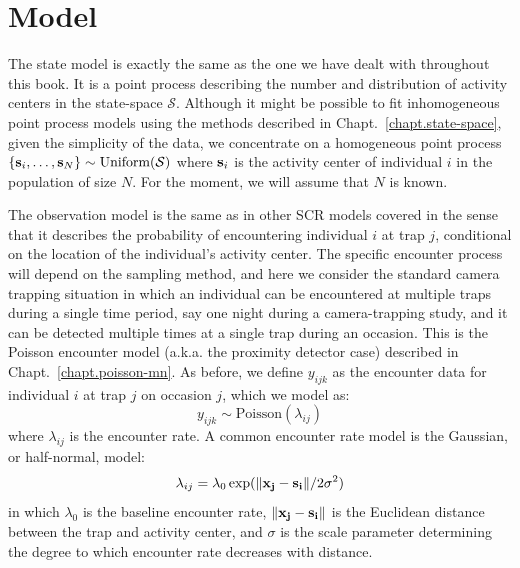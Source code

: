 
\section{Model}

The state model is exactly the same as the one we have dealt with
throughout
this book. It is a point process describing the number and distribution of
activity centers in the state-space $\mathcal{S}$. Although it might
be possible to fit inhomogeneous point process models using the
methods described in Chapt.~\ref{chapt.state-space},
given the simplicity of the data, we concentrate on a homogeneous point process
$\{{\bf s}_i, \ldots, {\bf s}_N\} \sim \text{Uniform}(\mathcal{S})$
where ${\bf s}_i$ is the activity center of individual $i$ in the
population of size $N$. For the moment, we will assume that $N$ is
known.

The observation model is the same as in other SCR models covered
in the sense that it describes the probability of encountering individual
$i$ at trap $j$, conditional on the location of the individual's
activity center. The specific encounter process will depend on the
sampling method, and here we consider the standard camera trapping
situation in which an individual can be encountered at multiple traps
during a single time period, say one night during a camera-trapping
study, and it can be detected multiple times at a single trap during
an occasion. This is the Poisson encounter model (a.k.a. the proximity
detector case) described in
Chapt.~\ref{chapt.poisson-mn}. As before, we define $y_{ijk}$ as the
encounter data for individual $i$ at trap $j$ on occasion $j$, which
we model as:
\begin{equation}
 y_{ijk} \sim \mbox{Poisson}(\lambda_{ij})
\label{eq.latentPoisson}
\end{equation}
where $\lambda_{ij}$ is the encounter rate. A common encounter rate model is the
Gaussian, or half-normal, model:
\[
\lambda_{ij} = \lambda_0 \exp(\| {\bf x_j - s_i} \| / 2\sigma^2)
\]
in which $\lambda_0$ is the baseline encounter rate, $\| {\bf x_j - s_i}
\|$ is the Euclidean distance between the trap and activity center, and $\sigma$ is the
scale parameter determining the degree to which encounter rate decreases with
distance.

